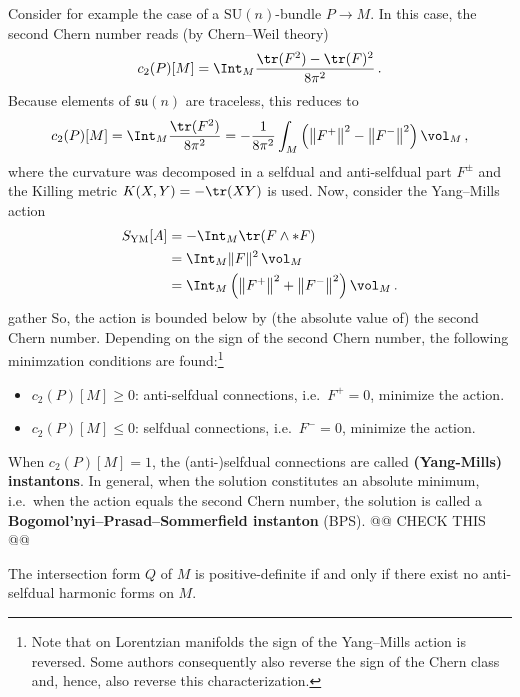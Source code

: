     Consider for example the case of a $\mathrm{SU}(n)$-bundle $P\rightarrow M$. In this case, the second Chern number reads (by Chern--Weil theory)
    \begin{gather}
        c_2(P)[M] = \Int_M\frac{\tr(F^2)-\tr(F)^2}{8\pi^2}\,.
    \end{gather}
    Because elements of $\mathfrak{su}(n)$ are traceless, this reduces to
    \begin{gather}
        c_2(P)[M] = \Int_M\frac{\tr(F^2)}{8\pi^2}=-\frac{1}{8\pi^2}\int_M\left(\left\|F^+\right\|^2-\left\|F^-\right\|^2\right)\vol_M\,,
    \end{gather}
    where the curvature was decomposed in a selfdual and anti-selfdual part $F^\pm$ and the Killing metric $K(X,Y)=-\tr(XY)$ is used. Now, consider the Yang--Mills action
    \begin{align*}
        S_{\text{YM}}[A] &= -\Int_M\tr(F\wedge\ast F)\\
        &= \Int_M\|F\|^2\,\vol_M\\
        &= \Int_M\left(\left\|F^+\right\|^2+\left\|F^-\right\|^2\right)\vol_M\,.
    \end{align*}{gather}
    So, the action is bounded below by (the absolute value of) the second Chern number. Depending on the sign of the second Chern number, the following minimzation conditions are found:\footnote{Note that on Lorentzian manifolds the sign of the Yang--Mills action is reversed. Some authors consequently also reverse the sign of the Chern class and, hence, also reverse this characterization.}
    \begin{itemize}
        \item $c_2(P)[M]\geq0$: anti-selfdual connections, i.e.~$F^+=0$, minimize the action.
        \item $c_2(P)[M]\leq0$: selfdual connections, i.e.~$F^-=0$, minimize the action.
    \end{itemize}
    When $c_2(P)[M]=1$, the (anti-)selfdual connections are called \textbf{(Yang-Mills) instantons}. In general, when the solution constitutes an absolute minimum, i.e.~when the action equals the second Chern number, the solution is called a \textbf{Bogomol'nyi--Prasad--Sommerfield instanton} (BPS).  @@ CHECK THIS @@

    \begin{property}
        The intersection form $Q$ of $M$ is positive-definite if and only if there exist no anti-selfdual harmonic forms on $M$.
    \end{property}

